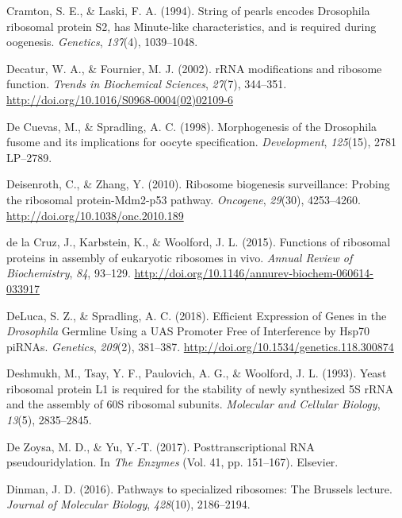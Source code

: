 \documentclass[12pt,twoside]{reedthesis}
\newlength{\cslhangindent}
\newenvironment{cslreferences}%
  {\setlength{\parindent}{0pt}%
  \everypar{\setlength{\hangindent}{\cslhangindent}}\ignorespaces}%
  {\par}
\begin{document}
\begin{cslreferences}
\leavevmode\hypertarget{ref-Cramton1994a}{}%
Cramton, S. E., \& Laski, F. A. (1994). String of pearls encodes Drosophila ribosomal protein S2, has Minute-like characteristics, and is required during oogenesis. \emph{Genetics}, \emph{137}(4), 1039--1048.

\leavevmode\hypertarget{ref-Decatur2002b}{}%
Decatur, W. A., \& Fournier, M. J. (2002). rRNA modifications and ribosome function. \emph{Trends in Biochemical Sciences}, \emph{27}(7), 344--351. \url{http://doi.org/10.1016/S0968-0004(02)02109-6}

\leavevmode\hypertarget{ref-DeCuevas1998f}{}%
De Cuevas, M., \& Spradling, A. C. (1998). Morphogenesis of the Drosophila fusome and its implications for oocyte specification. \emph{Development}, \emph{125}(15), 2781 LP--2789.

\leavevmode\hypertarget{ref-Deisenroth2010e}{}%
Deisenroth, C., \& Zhang, Y. (2010). Ribosome biogenesis surveillance: Probing the ribosomal protein-Mdm2-p53 pathway. \emph{Oncogene}, \emph{29}(30), 4253--4260. \url{http://doi.org/10.1038/onc.2010.189}

\leavevmode\hypertarget{ref-delacruzFunctionsRibosomalProteins2015}{}%
de la Cruz, J., Karbstein, K., \& Woolford, J. L. (2015). Functions of ribosomal proteins in assembly of eukaryotic ribosomes in vivo. \emph{Annual Review of Biochemistry}, \emph{84}, 93--129. \url{http://doi.org/10.1146/annurev-biochem-060614-033917}

\leavevmode\hypertarget{ref-delucaEfficientExpressionGenes2018}{}%
DeLuca, S. Z., \& Spradling, A. C. (2018). Efficient Expression of Genes in the \emph{Drosophila} Germline Using a UAS Promoter Free of Interference by Hsp70 piRNAs. \emph{Genetics}, \emph{209}(2), 381--387. \url{http://doi.org/10.1534/genetics.118.300874}

\leavevmode\hypertarget{ref-Deshmukh1993a}{}%
Deshmukh, M., Tsay, Y. F., Paulovich, A. G., \& Woolford, J. L. (1993). Yeast ribosomal protein L1 is required for the stability of newly synthesized 5S rRNA and the assembly of 60S ribosomal subunits. \emph{Molecular and Cellular Biology}, \emph{13}(5), 2835--2845.

\leavevmode\hypertarget{ref-DeZoysa2017}{}%
De Zoysa, M. D., \& Yu, Y.-T. (2017). Posttranscriptional RNA pseudouridylation. In \emph{The Enzymes} (Vol. 41, pp. 151--167). Elsevier.

\leavevmode\hypertarget{ref-Dinman2016a}{}%
Dinman, J. D. (2016). Pathways to specialized ribosomes: The Brussels lecture. \emph{Journal of Molecular Biology}, \emph{428}(10), 2186--2194.


\end{cslreferences}
\end{document}
